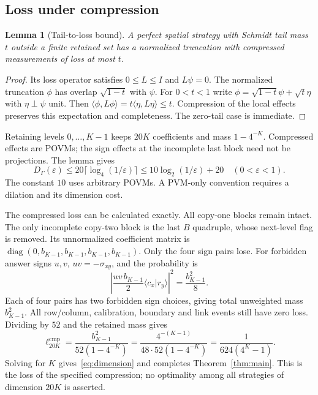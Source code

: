 \documentclass[11pt]{article}
\newtheorem{lemma}[theorem]{Lemma}
\theoremstyle{definition}
\DeclareMathOperator{\diag}{diag}
\newcommand{\eps}{\varepsilon}
\begin{document}
\subsection{Loss under compression}
\begin{lemma}[Tail-to-loss bound]\label{lem:tail}
A perfect spatial strategy with Schmidt tail mass $t$ outside a finite retained set has a normalized truncation with compressed measurements of loss at most $t$.
\end{lemma}
\begin{proof}
Its loss operator satisfies $0\leq L\leq I$ and $L\psi=0$. The normalized truncation $\phi$ has overlap $\sqrt{1-t}$ with $\psi$. For $0<t<1$ write $\phi=\sqrt{1-t}\psi+\sqrt t\eta$ with $\eta\perp\psi$ unit. Then $\langle\phi,L\phi\rangle=t\langle\eta,L\eta\rangle\leq t$. Compression of the local effects preserves this expectation and completeness. The zero-tail case is immediate.
\end{proof}

Retaining levels $0,\ldots,K-1$ keeps $20K$ coefficients and mass $1-4^{-K}$. Compressed effects are POVMs; the sign effects at the incomplete last block need not be projections. The lemma gives
\[
D_\Gamma(\eps)\leq20\lceil\log_4(1/\eps)\rceil
\leq10\log_2(1/\eps)+20\quad(0<\eps<1).
\]
The constant $10$ uses arbitrary POVMs. A PVM-only convention requires a dilation and its dimension cost.

The compressed loss can be calculated exactly. All copy-one blocks remain intact. The only incomplete copy-two block is the last $B$ quadruple, whose next-level flag is removed. Its unnormalized coefficient matrix is $\diag(0,b_{K-1},b_{K-1},b_{K-1},b_{K-1})$. Only the four sign pairs lose. For forbidden answer signs $u,v$, $uv=-\sigma_{xy}$, and the probability is
\[
\left|\frac{uv\,b_{K-1}}2\langle c_x|r_y\rangle\right|^2
=\frac{b_{K-1}^2}{8}.
\]
Each of four pairs has two forbidden sign choices, giving total unweighted mass $b_{K-1}^2$. All row/column, calibration, boundary and link events still have zero loss. Dividing by $52$ and the retained mass gives
\[
\ell^{\mathrm{cmp}}_{20K}=\frac{b_{K-1}^2}{52(1-4^{-K})}
=\frac{4^{-(K-1)}}{48\cdot52(1-4^{-K})}
=\frac{1}{624(4^K-1)}.
\]
Solving for $K$ gives~\eqref{eq:dimension} and completes Theorem~\ref{thm:main}. This is the loss of the specified compression; no optimality among all strategies of dimension $20K$ is asserted.
\end{document}
